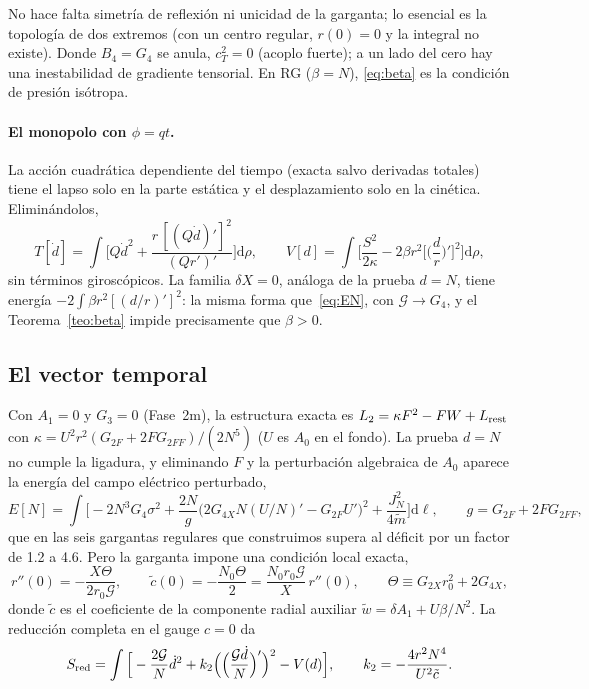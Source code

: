 \documentclass[11pt,a4paper]{article}
\theoremstyle{remark}
\newcommand{\G}{\mathcal G}
\newcommand{\dd}{\mathrm d}
\begin{document}
No hace falta simetría de reflexión ni unicidad de la garganta; lo esencial es la topología de dos extremos (con un centro regular, $r(0)=0$ y la integral no existe). Donde $B_4=G_4$ se anula, $c_T^2=0$ (acoplo fuerte); a un lado del cero hay una inestabilidad de gradiente tensorial. En RG ($\beta=N$), \eqref{eq:beta} es la condición de presión isótropa.

\paragraph{El monopolo con $\phi=qt$.} La acción cuadrática dependiente del tiempo (exacta salvo derivadas totales) tiene el lapso solo en la parte estática y el desplazamiento solo en la cinética. Eliminándolos,
\begin{equation}
T[\dot d]=\int\Big[Q\dot d^2+\frac{r\,[(Q\dot d)']^2}{(Qr')'}\Big]\dd\rho,\qquad
V[d]=\int\Big[\frac{S^2}{2\kappa}-2\beta r^2\Big[\Big(\frac dr\Big)'\Big]^2\Big]\dd\rho,
\label{eq:Tqt}
\end{equation}
sin términos giroscópicos. La familia $\delta X=0$, análoga de la prueba $d=N$, tiene energía $-2\int\beta r^2[(d/r)']^2$: la misma forma que~\eqref{eq:EN}, con $\G\to G_4$, y el Teorema~\ref{teo:beta} impide precisamente que $\beta>0$.

\subsection{El vector temporal}

Con $A_1=0$ y $G_3=0$ (Fase~2m), la estructura exacta es $L_2=\kappa F^2-FW+L_{\rm rest}$ con $\kappa=U^2r^2(G_{2F}+2FG_{2FF})/(2N^5)$ ($U$ es $A_0$ en el fondo). La prueba $d=N$ no cumple la ligadura, y eliminando $F$ y la perturbación algebraica de $A_0$ aparece la energía del campo eléctrico perturbado,
\begin{equation}
E[N]=\int\Big[-2N^3G_4\sigma^2+\frac{2N}{g}\big(2G_{4X}N(U/N)'-G_{2F}U'\big)^2+\frac{J_N^2}{4\tilde m}\Big]\dd\ell,\qquad g=G_{2F}+2FG_{2FF},
\end{equation}
que en las seis gargantas regulares que construimos supera al déficit por un factor de 1.2 a 4.6. Pero la garganta impone una condición local exacta,
\begin{equation}
r''(0)=-\frac{X\Theta}{2r_0\G},\qquad \tilde c(0)=-\frac{N_0\Theta}{2}=\frac{N_0r_0\G}{X}\,r''(0),\qquad \Theta\equiv G_{2X}r_0^2+2G_{4X},
\end{equation}
donde $\tilde c$ es el coeficiente de la componente radial auxiliar $\tilde w=\delta A_1+U\beta/N^2$. La reducción completa en el gauge $c=0$ da
\begin{equation}
S_{\rm red}=\int\Big[-\frac{2\G}{N}\dot d^2+k_2\Big(\Big(\frac{\G\dot d}{N}\Big)'\Big)^2-V(d)\Big],\qquad k_2=-\frac{4r^2N^4}{U^2\tilde c}.
\end{equation}
\end{document}
